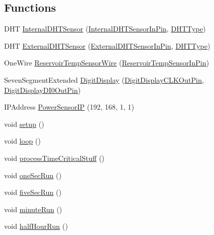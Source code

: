 \subsection*{Functions}
\begin{DoxyCompactItemize}
\item 
D\+HT \mbox{\hyperlink{_gbox420_8ino_abdcf561f5426d52892b5a1a8db3e26aa}{Internal\+D\+H\+T\+Sensor}} (\mbox{\hyperlink{420_pins_8h_a1faa933a60b338f39c3f2069e0180c25}{Internal\+D\+H\+T\+Sensor\+In\+Pin}}, \mbox{\hyperlink{_gbox420_8ino_adc7a68db9f5a31bc91546195883a2bbc}{D\+H\+T\+Type}})
\item 
D\+HT \mbox{\hyperlink{_gbox420_8ino_a7ea7d734b9d426453567372a04e101a2}{External\+D\+H\+T\+Sensor}} (\mbox{\hyperlink{420_pins_8h_ab7204e8321ecef66088c3377c358b17f}{External\+D\+H\+T\+Sensor\+In\+Pin}}, \mbox{\hyperlink{_gbox420_8ino_adc7a68db9f5a31bc91546195883a2bbc}{D\+H\+T\+Type}})
\item 
One\+Wire \mbox{\hyperlink{_gbox420_8ino_a34e274782a1598e7e41f428d47e47e5e}{Reservoir\+Temp\+Sensor\+Wire}} (\mbox{\hyperlink{420_pins_8h_a5e2eca6269f00e18c7e02293e21489ed}{Reservoir\+Temp\+Sensor\+In\+Pin}})
\item 
Seven\+Segment\+Extended \mbox{\hyperlink{_gbox420_8ino_a2a5f059bc1d0b6f05063c655ac1ae398}{Digit\+Display}} (\mbox{\hyperlink{420_pins_8h_adb1e212b16f1e3f4084695b7447adcaf}{Digit\+Display\+C\+L\+K\+Out\+Pin}}, \mbox{\hyperlink{420_pins_8h_aabf655d6bafe568ddf231736884f2f02}{Digit\+Display\+D\+I0\+Out\+Pin}})
\item 
I\+P\+Address \mbox{\hyperlink{_gbox420_8ino_aea90dc7a6aac34e53c341365537c207a}{Power\+Sensor\+IP}} (192, 168, 1, 1)
\item 
void \mbox{\hyperlink{_gbox420_8ino_a4fc01d736fe50cf5b977f755b675f11d}{setup}} ()
\item 
void \mbox{\hyperlink{_gbox420_8ino_afe461d27b9c48d5921c00d521181f12f}{loop}} ()
\item 
void \mbox{\hyperlink{_gbox420_8ino_a3dd0de28dbd52701ac83ee0a76ebd4ce}{process\+Time\+Critical\+Stuff}} ()
\item 
void \mbox{\hyperlink{_gbox420_8ino_a3a6b6a850e6639263f314a042b1bb4e7}{one\+Sec\+Run}} ()
\item 
void \mbox{\hyperlink{_gbox420_8ino_a2e87663d43b502972c5607223fb5e7d2}{five\+Sec\+Run}} ()
\item 
void \mbox{\hyperlink{_gbox420_8ino_ab368cbcf5cb1931e10a965b20c44feb1}{minute\+Run}} ()
\item 
void \mbox{\hyperlink{_gbox420_8ino_a1ce97cb95a80a23343e3f65420163919}{half\+Hour\+Run}} ()

\end{DoxyCompactItemize}
